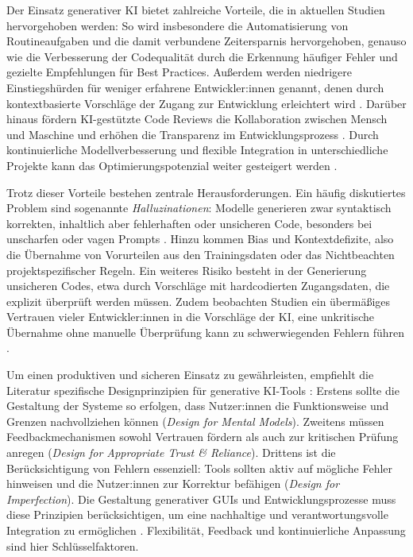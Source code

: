 Der Einsatz generativer KI bietet zahlreiche Vorteile, die in aktuellen Studien
hervorgehoben werden: So wird insbesondere die Automatisierung von
Routineaufgaben und die damit verbundene Zeitersparnis hervorgehoben, genauso
wie die Verbesserung der Codequalität durch die Erkennung häufiger Fehler und
gezielte Empfehlungen für Best Practices. Außerdem werden niedrigere
Einstiegshürden für weniger erfahrene Entwickler:innen genannt, denen durch
kontextbasierte Vorschläge der Zugang zur Entwicklung erleichtert wird
\cite{donvir_role_2024, sergeyuk_human-ai_2025}. Darüber hinaus fördern
KI-gestützte Code Reviews die Kollaboration zwischen Mensch und Maschine und
erhöhen die Transparenz im Entwicklungsprozess \cite{alami_human_2025}. Durch
kontinuierliche Modellverbesserung und flexible Integration in unterschiedliche
Projekte kann das Optimierungspotenzial weiter gesteigert werden
\cite{kerr_github_nodate, weisz_design_2024}.

Trotz dieser Vorteile bestehen zentrale Herausforderungen. Ein häufig
diskutiertes Problem sind sogenannte \textit{Halluzinationen}: Modelle
generieren zwar syntaktisch korrekten, inhaltlich aber fehlerhaften oder
unsicheren Code, besonders bei unscharfen oder vagen Prompts
\cite{shi_ai-assisted_2023, weisz_design_2024}. Hinzu kommen Bias und
Kontextdefizite, also die Übernahme von Vorurteilen aus den Trainingsdaten oder
das Nichtbeachten projektspezifischer Regeln. Ein weiteres Risiko besteht in
der Generierung unsicheren Codes, etwa durch Vorschläge mit hardcodierten
Zugangsdaten, die explizit überprüft werden müssen. Zudem beobachten Studien
ein übermäßiges Vertrauen vieler Entwickler:innen in die Vorschläge der KI,
eine unkritische Übernahme ohne manuelle Überprüfung kann zu schwerwiegenden
Fehlern führen \cite{shi_ai-assisted_2023, weisz_design_2024}.

Um einen produktiven und sicheren Einsatz zu gewährleisten, empfiehlt die
Literatur spezifische Designprinzipien für generative KI-Tools
\cite{weisz_design_2024}: Erstens sollte die Gestaltung der Systeme so
erfolgen, dass Nutzer:innen die Funktionsweise und Grenzen nachvollziehen
können (\textit{Design for Mental Models}). Zweitens müssen Feedbackmechanismen
sowohl Vertrauen fördern als auch zur kritischen Prüfung anregen
(\textit{Design for Appropriate Trust \& Reliance}). Drittens ist die
Berücksichtigung von Fehlern essenziell: Tools sollten aktiv auf mögliche
Fehler hinweisen und die Nutzer:innen zur Korrektur befähigen (\textit{Design
    for Imperfection}). Die Gestaltung generativer GUIs und Entwicklungsprozesse
muss diese Prinzipien berücksichtigen, um eine nachhaltige und
verantwortungsvolle Integration zu ermöglichen \cite{lee_towards_2025,
    chen_genui_2025, gill_agile_2025}. Flexibilität, Feedback und kontinuierliche
Anpassung sind hier Schlüsselfaktoren.

